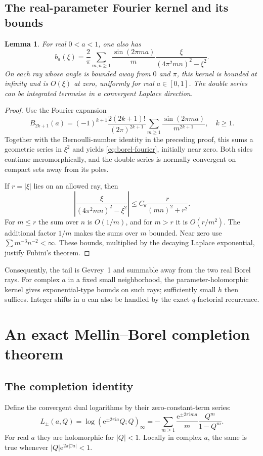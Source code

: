 \documentclass[11pt,a4paper]{article}
\numberwithin{equation}{section}
\newtheorem{lemma}[theorem]{Lemma}
\theoremstyle{definition}
\theoremstyle{remark}\newtheorem{remark}[theorem]{Remark}
\newcommand{\ii}{\mathrm i}\newcommand{\e}{\mathrm e}
\begin{document}
\subsection{The real-parameter Fourier kernel and its bounds}
\begin{lemma}\label{lem:fourier-kernel}
For real $0<a<1$, one also has
\begin{equation}\label{eq:borel-fourier}
 b_a(\xi)=\frac2\pi\sum_{m,n\ge1}\frac{\sin(2\pi ma)}m
      \frac{\xi}{(4\pi^2mn)^2-\xi^2}.
\end{equation}
On each ray whose angle is bounded away from $0$ and $\pi$, this kernel
is bounded at infinity and is $O(\xi)$ at zero, uniformly for real
$a\in[0,1]$. The double series can be integrated termwise in a
convergent Laplace direction.
\end{lemma}
\begin{proof}
Use the Fourier expansion
\[
 B_{2k+1}(a)=(-1)^{k+1}
 \frac{2(2k+1)!}{(2\pi)^{2k+1}}
 \sum_{m\ge1}\frac{\sin(2\pi ma)}{m^{2k+1}},\quad k\ge1.
\]
Together with the Bernoulli-number identity in the preceding proof,
this sums a geometric series in $\xi^2$ and yields
\eqref{eq:borel-fourier}, initially near zero. Both sides continue
meromorphically, and the double series is normally convergent on compact
sets away from its poles.

If $r=|\xi|$ lies on an allowed ray, then
\[
 \left|\frac{\xi}{(4\pi^2mn)^2-\xi^2}\right|
 \le C_\theta\frac{r}{(mn)^2+r^2}.
\]
For $m\le r$ the sum over $n$ is $O(1/m)$, and for $m>r$ it is
$O(r/m^2)$. The additional factor $1/m$ makes the sums over $m$
bounded. Near zero use $\sum m^{-3}n^{-2}<\infty$. These bounds,
multiplied by the decaying Laplace exponential, justify Fubini's theorem.
\end{proof}
Consequently, the tail is Gevrey~1 and summable away from the two real
Borel rays. For complex $a$ in a fixed small neighborhood, the
parameter-holomorphic kernel gives exponential-type bounds on such
rays; sufficiently small $h$ then suffices. Integer shifts in $a$ can
also be handled by the exact $q$-factorial recurrence.

\section{An exact Mellin--Borel completion theorem}
\label{sec:mellin}

\subsection{The completion identity}
Define the convergent dual logarithms by their zero-constant-term series:
\begin{equation}\label{eq:Lpm}
 L_\pm(a,Q)=\log(\e^{\pm2\pi\ii a}Q;Q)_\infty
 =-\sum_{m\ge1}\frac{\e^{\pm2\pi\ii ma}}m\frac{Q^m}{1-Q^m}.
\end{equation}
For real $a$ they are holomorphic for $|Q|<1$. Locally in complex $a$,
the same is true whenever $|Q|\e^{2\pi|\Im a|}<1$.
\end{document}
